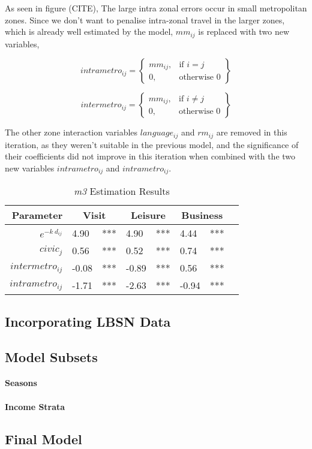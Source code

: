 As seen in figure (CITE), The large intra zonal errors occur in small metropolitan zones. Since we don't want to penalise intra-zonal travel in the larger zones, which is already well estimated by the model,  $mm_{ij}$  is replaced with two new variables,

	$$	
	intrametro_{ij} = \left.
  \begin{cases}
    mm_{ij}, & \text{if } i = j \\
    0, & \text{otherwise } 0 
  \end{cases}
  \right\}
	$$
  
	$$	
	intermetro_{ij} = \left.
  \begin{cases}
    mm_{ij}, & \text{if } i \neq j \\
    0, & \text{otherwise } 0 
  \end{cases}
  \right\}
	$$
	
The other zone interaction variables $language_{ij}$  and $rm_{ij}$  are removed in this iteration, as they weren't suitable in the previous model, and the significance of their coefficients did not improve in this iteration when combined with the two new variables $intrametro_{ij}$ and $intrametro_{ij}$.


\begin{table}[H]
\centering
\caption{\textit{m3} Estimation Results}
\begin{tabular}{@{}rlrlrlrl@{}}
  \toprule
 Parameter & \multicolumn{2}{c}{Visit} & \multicolumn{2}{c}{Leisure} & \multicolumn{2}{c}{Business} &  \\ \midrule
  $e^{-k\ d_{ij}}$ 	& 4.90 	& *** & 4.90 & *** & 4.44 & *** \\ 
  $civic_j$ & 0.56 	& *** 	& 0.52 & *** & 0.74 & *** \\ 
  $intermetro_{ij}$ & -0.08 & *** & -0.89 & *** & 0.56 & *** \\ 
  $intrametro_{ij}$ & -1.71 & *** & -2.63 & *** & -0.94 & *** \\ 
   \bottomrule
\end{tabular}
\end{table}



\subsection{Incorporating LBSN Data}
\subsection{Model Subsets}
\paragraph{Seasons}
\paragraph{Income Strata}
\subsection{Final Model}


